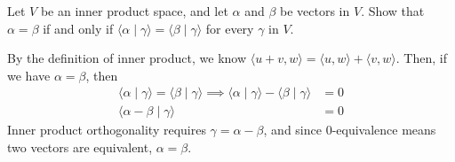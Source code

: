 \documentclass[11pt]{article}
\begin{document}
\begin{homeworkProblem}

    Let $V$ be an inner product space, and let $\alpha$ and $\beta$ be vectors in $V$. Show that $\alpha = \beta$ if and
    only if $\langle\alpha \mid \gamma\rangle = \langle\beta \mid \gamma\rangle$ for every $\gamma$ in $V$. \\

    \solution

    By the definition of inner product, we know $\langle u + v, w \rangle = \langle u, w \rangle + \langle v, w \rangle$. Then, if we have $\alpha = \beta$, then
    \begin{align*}
        \langle \alpha \mid \gamma \rangle = \langle \beta \mid \gamma \rangle \implies \langle \alpha \mid \gamma \rangle - \langle \beta \mid \gamma \rangle & = 0 \\
        \langle \alpha - \beta \mid \gamma \rangle                                                                                                             & = 0
    \end{align*}
    Inner product orthogonality requires $\gamma = \alpha - \beta$, and since $0$-equivalence means two vectors are equivalent, $\alpha = \beta$.

\end{homeworkProblem}

\pagebreak
\end{document}
